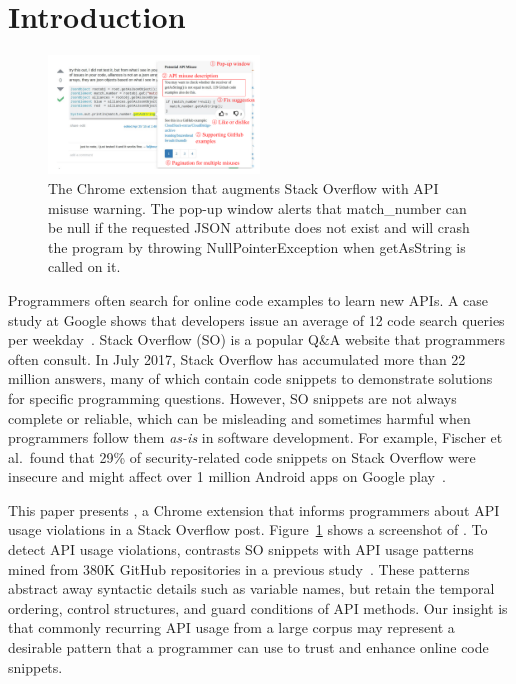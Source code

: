 \section{Introduction}
\label{sec:intro}

\begin{figure}
\centering
\includegraphics[width=0.5\textwidth]{soap-v4.pdf}
  \caption{The {\tool} Chrome extension that augments Stack Overflow with API misuse warning. The pop-up window alerts that {\ttt match\_number} can be {\ttt null} if the requested {\ttt JSON} attribute does not exist and will crash the program by throwing {\ttt NullPointerException} when {\ttt getAsString} is called on it.}
  \label{fig:screenshot}
\end{figure}

Programmers often search for online code examples to learn new APIs. A case study at Google shows that developers issue an average of 12 code search queries per weekday~\cite{sadowski2015developers}. Stack Overflow (SO) is a popular Q\&A website that programmers often consult. In July 2017, Stack Overflow has accumulated more than 22 million answers, many of which contain code snippets to demonstrate solutions for specific programming questions. However, SO snippets are not always complete or reliable, which can be misleading and sometimes harmful when programmers follow them {\em as-is} in software development. For example, Fischer et al.~found that 29\% of security-related code snippets on Stack Overflow were insecure and might affect over 1 million Android apps on Google play~\cite{fischer2017stack}. 

This paper presents {\tool}, a Chrome extension that informs programmers about API usage violations in a Stack Overflow post. Figure~\ref{fig:screenshot} shows a screenshot of {\tool}. To detect API usage violations, {\tool} contrasts SO snippets with API usage patterns mined from 380K GitHub repositories in a previous study~\cite{zhang2018code}. These patterns abstract away syntactic details such as variable names, but retain the temporal ordering, control structures, and guard conditions of API methods. Our insight is that commonly recurring API usage from a large corpus may represent a desirable pattern that a programmer can use to trust and enhance online code snippets. 


